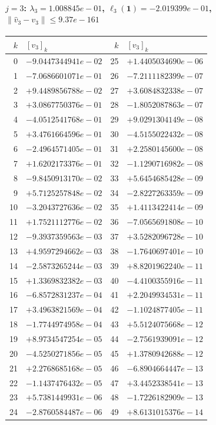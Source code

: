 \documentclass[11pt]{article}
\begin{document}
\paragraph{$j = 3$: $\lambda_{3} = 1.008845e-01$, \quad $\ell_{3}(\mathbf{1}) = -2.019399e-01$, \quad $\|\hat v_{3} - v_{3}\| \leq 9.37e-161$}
\begin{center}
{\footnotesize
\begin{tabular}{r@{\;\;}l@{\quad}r@{\;\;}l}
\toprule
$k$ & $[v_{3}]_k$ & $k$ & $[v_{3}]_k$ \\
\midrule
0 & $-9.0447344941e-02$ & 25 & $+1.4405034690e-06$ \\
1 & $-7.0686601071e-01$ & 26 & $-7.2111182399e-07$ \\
2 & $+9.4489856788e-02$ & 27 & $+3.6084832338e-07$ \\
3 & $+3.0867750376e-01$ & 28 & $-1.8052087863e-07$ \\
4 & $-4.0512541768e-01$ & 29 & $+9.0291304149e-08$ \\
5 & $+3.4761664596e-01$ & 30 & $-4.5155022432e-08$ \\
6 & $-2.4964571405e-01$ & 31 & $+2.2580145600e-08$ \\
7 & $+1.6202173376e-01$ & 32 & $-1.1290716982e-08$ \\
8 & $-9.8450913170e-02$ & 33 & $+5.6454685428e-09$ \\
9 & $+5.7125257848e-02$ & 34 & $-2.8227263359e-09$ \\
10 & $-3.2043727636e-02$ & 35 & $+1.4113422414e-09$ \\
11 & $+1.7521112776e-02$ & 36 & $-7.0565691808e-10$ \\
12 & $-9.3937359563e-03$ & 37 & $+3.5282096728e-10$ \\
13 & $+4.9597294662e-03$ & 38 & $-1.7640697401e-10$ \\
14 & $-2.5873265244e-03$ & 39 & $+8.8201962240e-11$ \\
15 & $+1.3369832382e-03$ & 40 & $-4.4100355916e-11$ \\
16 & $-6.8572831237e-04$ & 41 & $+2.2049934531e-11$ \\
17 & $+3.4963821569e-04$ & 42 & $-1.1024877405e-11$ \\
18 & $-1.7744974958e-04$ & 43 & $+5.5124075668e-12$ \\
19 & $+8.9734547254e-05$ & 44 & $-2.7561939091e-12$ \\
20 & $-4.5250271856e-05$ & 45 & $+1.3780942688e-12$ \\
21 & $+2.2768685168e-05$ & 46 & $-6.8904664447e-13$ \\
22 & $-1.1437476432e-05$ & 47 & $+3.4452338541e-13$ \\
23 & $+5.7381449931e-06$ & 48 & $-1.7226182909e-13$ \\
24 & $-2.8760584487e-06$ & 49 & $+8.6131015376e-14$ \\
\bottomrule
\end{tabular}
}
\end{center}
\end{document}
